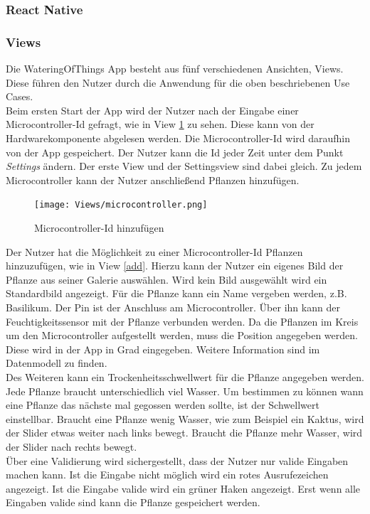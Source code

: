         \subsubsection{React Native}
        \subsubsection{Views}
Die WateringOfThings App besteht aus fünf verschiedenen Ansichten, Views. Diese führen den Nutzer durch die Anwendung für die oben beschriebenen Use Cases. \\

Beim ersten Start der App wird der Nutzer nach der Eingabe einer Microcontroller-Id gefragt, wie in View \ref{microcontroller} zu sehen. Diese kann von der Hardwarekomponente abgelesen werden. Die Microcontroller-Id wird daraufhin von der App gespeichert. Der Nutzer kann die Id jeder Zeit unter dem Punkt \textit{Settings} ändern. Der erste View und der Settingsview sind dabei gleich. Zu jedem Microcontroller kann der Nutzer anschließend Pflanzen hinzufügen.  
\begin{figure}[H]
    \centering
    \texttt{[image: Views/microcontroller.png]}
    \caption{Microcontroller-Id hinzufügen}
    \label{microcontroller}
\end{figure}

Der Nutzer hat die Möglichkeit zu einer Microcontroller-Id Pflanzen hinzuzufügen, wie in View \ref{add}. Hierzu kann der Nutzer ein eigenes Bild der Pflanze aus seiner Galerie auswählen. Wird kein Bild ausgewählt wird ein Standardbild angezeigt. Für die Pflanze kann ein Name vergeben werden, z.B. Basilikum. Der Pin ist der Anschluss am Microcontroller. Über ihn kann der Feuchtigkeitssensor mit der Pflanze verbunden werden. Da die Pflanzen im Kreis um den Microcontroller aufgestellt werden, muss die Position angegeben werden. Diese wird in der App in Grad eingegeben. Weitere Information sind im Datenmodell zu finden. \\

Des Weiteren kann ein Trockenheitsschwellwert für die Pflanze angegeben werden. Jede Pflanze braucht unterschiedlich viel Wasser. Um bestimmen zu können wann eine Pflanze das nächste mal gegossen werden sollte, ist der Schwellwert einstellbar. Braucht eine Pflanze wenig Wasser, wie zum Beispiel ein Kaktus, wird der Slider etwas weiter nach links bewegt. Braucht die Pflanze mehr Wasser, wird der Slider nach rechts bewegt. \\

Über eine Validierung wird sichergestellt, dass der Nutzer nur valide Eingaben machen kann. Ist die Eingabe nicht möglich wird ein rotes Ausrufezeichen angezeigt. Ist die Eingabe valide wird ein grüner Haken angezeigt. Erst wenn alle Eingaben valide sind kann die Pflanze gespeichert werden. 


